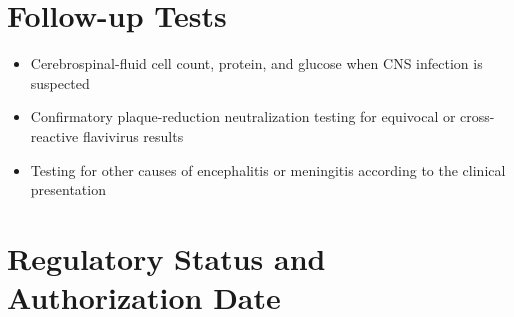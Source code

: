 \section*{Follow-up Tests}
\begin{itemize}
  \item Cerebrospinal-fluid cell count, protein, and glucose when CNS infection is suspected
  \item Confirmatory plaque-reduction neutralization testing for equivocal or cross-reactive flavivirus results
  \item Testing for other causes of encephalitis or meningitis according to the clinical presentation
\end{itemize}

\clearpage
\section*{Regulatory Status and Authorization Date}

\clearpage
